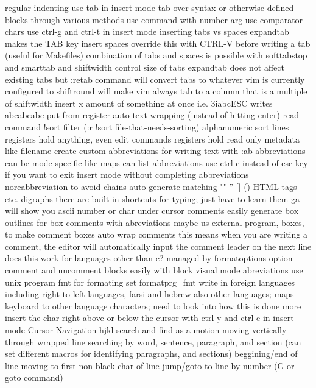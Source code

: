 \documentclass[12pt]{book}
\begin{document}
    regular indenting
      use tab in insert mode
      tab over syntax or otherwise defined blocks through various methods
      use command with number arg
      use comparator chars
      use ctrl-g and ctrl-t in insert mode
  inserting tabs vs spaces
    expandtab makes the TAB key insert spaces
    override this with CTRL-V before writing a tab (useful for Makefiles)
    combination of tabs and spaces is possible with softtabstop and smarttab and shiftwidth
		control size of tabs
		expandtab does not affect existing tabs but :retab command will convert tabs to whatever vim is currently configured to
		shiftround will make vim always tab to a column that is a multiple of shiftwidth
  insert x amount of something at once i.e. 3iabcESC writes abcabcabc
  put from register
  auto text wrapping (instead of hitting enter)
  read command
    !sort filter (:r !sort file-that-needs-sorting)
  alphanumeric sort lines
  registers hold anything, even edit commands
  registers hold read only metadata like filename
  create custom abbreviations for writing text with :ab
    abbreviations can be mode specific like maps
    can list abbreviations
    use ctrl-c instead of esc key if you want to exit insert mode without completing abbreviations
    noreabbreviation to avoid chains
  auto generate matching "" '' [] {} () HTML-tags etc.
  digraphs
    there are built in shortcuts for typing; just have to learn them
  ga will show you ascii number or char under cursor
  comments
    easily generate box outlines for box comments with abreviations
    maybe us external program, boxes, to make comment boxes
    auto wrap comments
      this means when you are writing a comment, the editor will automatically input the comment leader on the next line
      does this work for languages other than c?
      managed by formatoptions option
    comment and uncomment blocks easily with block visual mode
  abreviations
  use unix program fmt for formating
    set formatprg=fmt
  write in foreign languages including right to left languages, farsi and hebrew
    also other languages; maps keyboard to other language characters; need to look into how this is done more
  insert the char right above or below the cursor with ctrl-y and ctrl-e in insert mode
Cursor Navigation
  hjkl
  search and find as a motion
  moving vertically through wrapped line
  searching
  by word, sentence, paragraph, and section (can set different macros for identifying paragraphs, and sections)
  beggining/end of line
  moving to first non black char of line
  jump/goto
    to line by number (G or goto command)
\end{document}
